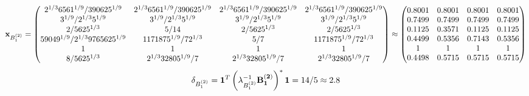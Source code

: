 \documentclass[10pt,a4paper]{article}
\begin{document}
	\[
		\bold{x}_{B_1^{(2)}} = 
		\begin{pmatrix}
			{{2^ {1 / 3}}{6561^ {1 / 9}}} / {{390625^ {1 / 9}}} & {{2^ {1 / 3}}{6561^ {1 / 9}}} / {{390625^ {1 / 9}}} & {{2^ {1 / 3}}{6561^ {1 / 9}}} / {{390625^ {1 / 9}}} & {{2^ {1 / 3}}{6561^ {1 / 9}}} / {{390625^ {1 / 9}}} \\
			{{3^ {1 / 9}}} / {{2^ {1 / 3}}{5^ {1 / 9}}} & {{3^ {1 / 9}}} / {{2^ {1 / 3}}{5^ {1 / 9}}} & {{3^ {1 / 9}}} / {{2^ {1 / 3}}{5^ {1 / 9}}} & {{3^ {1 / 9}}} / {{2^ {1 / 3}}{5^ {1 / 9}}} \\
			{{2}} / {{5625^ {1 / 3}}} & {{5}} / {{14}} & {{2}} / {{5625^ {1 / 3}}} & {{2}} / {{5625^ {1 / 3}}} \\
			{{59049^ {1 / 9}}} / {{2^ {1 / 3}}{9765625^ {1 / 9}}} & {{1171875^ {1 / 9}}} / {{7}{2^ {1 / 3}}} & {{5}} / {{7}} & {{1171875^ {1 / 9}}} / {{7}{2^ {1 / 3}}} \\
			{1}{} & {1}{} & {1}{} & {1}{} \\
			{{8}} / {{5625^ {1 / 3}}} & {{2^ {1 / 3}}{32805^ {1 / 9}}} / {{7}} & {{2^ {1 / 3}}{32805^ {1 / 9}}} / {{7}} & {{2^ {1 / 3}}{32805^ {1 / 9}}} / {{7}} \\
		\end{pmatrix}
		\approx
		\begin{pmatrix}
			0.8001   & 0.8001   & 0.8001   & 0.8001   \\
			0.7499   & 0.7499   & 0.7499   & 0.7499   \\
			0.1125   & 0.3571   & 0.1125   & 0.1125   \\
			0.4499   & 0.5356   & 0.7143   & 0.5356   \\
			1        & 1        & 1        & 1        \\
			0.4498   & 0.5715   & 0.5715   & 0.5715   \\
		\end{pmatrix}
	\]
	\[
		\delta_{B_1^{(2)}} = \bold{1}^T \left(\lambda_{B_1^{(2)}}^{-1}\bold{B_1^{(2)}}\right)^* \bold{1} = {{14}} / {{5}}\approx 2.8
	\]
\end{document}
